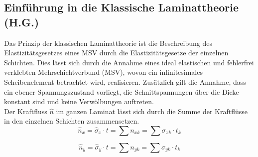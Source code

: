 \subsection{Einführung in die Klassische Laminattheorie (H.G.)}\label{CLT}
Das Prinzip der klassischen Laminattheorie ist die Beschreibung des Elastizitätsgesetzes eines MSV durch die Elastizitätsgesetze der einzelnen Schichten. Dies lässt sich durch die Annahme eines ideal elastischen und fehlerfrei verklebten Mehrschichtverbund (MSV), wovon ein infinitesimales Scheibenelement betrachtet wird, realisieren. Zusätzlich gilt die Annahme, dass ein ebener Spannungszustand vorliegt, die Schnittspannungen über die Dicke konstant sind und keine Verwölbungen auftreten.\\
\noindent
Der Kraftfluss $\hat{n}$ im ganzen Laminat lässt sich durch die Summe der Kraftflüsse in den einzelnen Schichten zusammensetzen.
\begin{equation}
\label{Kraftfluss}
\hat{n}_{x}=\hat{\sigma}_{x}\cdot t=\sum n_{xk}=\sum\sigma_{xk}\cdot t_{k}
\end{equation}

\begin{equation}
\hat{n}_{y}=\hat{\sigma}_{y}\cdot t=\sum n_{yk}=\sum\sigma_{yk}\cdot t_{k}
\end{equation}

